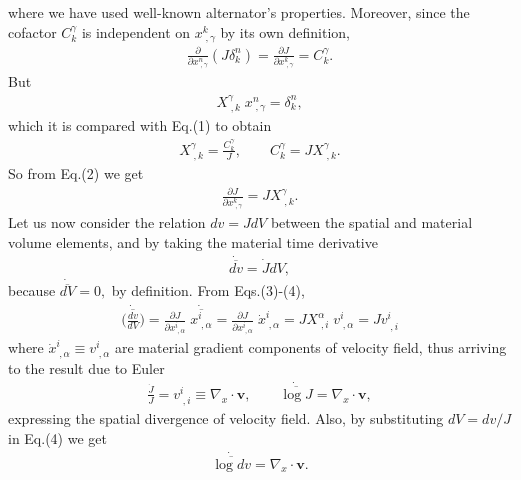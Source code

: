 \documentclass[12pt]{article}
\begin{document}
where we have used well-known alternator's properties. Moreover, since the cofactor $C^\gamma_k$ is independent on $x^k_{\;,\gamma}$ by its own definition,
\begin{align}
\frac{\partial}{\partial{x^n_{\;,\gamma}}}(J\delta^n_k)=
\frac{\partial{J}}{\partial{x^k_{\;,\gamma}}}=C^\gamma_k.
\end{align}
But
\begin{align*}
X^\gamma_{\;,k}\;x^n_{\;,\gamma}=\delta^n_k,
\end{align*}
which it is compared with Eq.(1) to obtain
\begin{align*}
X^\gamma_{\;,k}=\frac{C^\gamma_k}{J}, \qquad C^\gamma_k=JX^\gamma_{\;,k}.
\end{align*}
So from Eq.(2) we get
\begin{align}
\frac{\partial{J}}{\partial{x^k_{\;,\gamma}}}=JX^\gamma_{\;,k}.
\end{align}
Let us now consider the relation $dv=JdV$ between the spatial and material volume elements, and by taking the material time derivative
\begin{align}
\dot{\overline{dv}}=\dot{J}dV,
\end{align}
because $\dot{\overline{dV}}=0,$ by definition. From Eqs.(3)-(4),
\begin{align*}
\dot{\overline{\Big(\frac{dv}{dV}\Big)}}=
\frac{\partial{J}}{\partial{x^i_{\;,\alpha}}}
\;\dot{\overline{x^i_{\;,\alpha}}}=\frac{\partial{J}}{\partial{x^i_{\;,\alpha}}}
\;\dot{x}^i_{\;,\alpha}=JX^\alpha_{\;,i}\;v^i_{\;,\alpha}=Jv^i_{\;,i}
\end{align*}
where $\dot{x}^i_{\;,\alpha}\equiv{v^i_{\;,\alpha}}$ are material gradient components of velocity field, thus arriving to the result due to Euler\cite{cite:Euler}
\begin{align}
\frac{\dot{J}}{J}=v^i_{\;,i}\equiv\nabla_x\cdot\mathbf{v}, \qquad \dot{\overline{\log{J}}}=\nabla_x\cdot\mathbf{v},
\end{align}
expressing the spatial divergence of velocity field.
Also, by substituting $dV=dv/J$ in Eq.(4) we get
\begin{align}
\dot{\overline{\log{dv}}}=\nabla_x\cdot\mathbf{v}.
\end{align}
\end{document}
